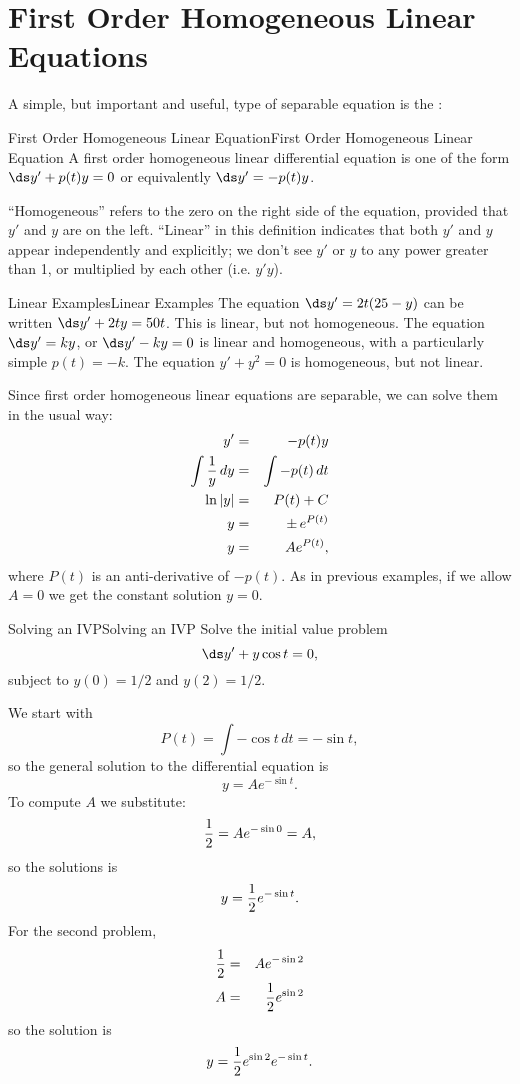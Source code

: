 \section{First Order Homogeneous Linear Equations}\label{sec:first order homogeneous linear}
A simple, but important and useful, type of separable equation is the
:

\begin{definition}{First Order Homogeneous Linear Equation}{First Order Homogeneous Linear Equation}\label{First Order Homogeneous Linear Equation}
A first order homogeneous linear differential equation
is one of
the form $\ds y' + p(t)y=0$
or equivalently
$\ds y' = -p(t)y$.
\end{definition}

``Homogeneous'' refers to the zero on the right side of the equation, provided that $y'$ and $y$ are on the left. ``Linear'' in this definition indicates that both $y'$ and $y$ appear independently and explicitly; we don't see $y'$ or $y$ to any power greater than 1, or multiplied by each other (i.e. $y'y$).

\begin{example}{Linear Examples}{Linear Examples}\label{Linear Examples}
 The equation $\ds y' = 2t(25-y)$ can be written
$\ds y' + 2ty= 50t$. This is linear, but not homogeneous. The
equation $\ds y'=ky$, or $\ds y'-ky=0$ is linear and
homogeneous, with a particularly simple $p(t)=-k$.
The equation $y'+y^2=0$ is homogeneous, but not linear.
\end{example}

Since first order homogeneous linear equations are separable, we can
solve them in the usual way:
\begin{eqnarray*}
y' &=& -p(t)y\cr
\int {1\over y}\,dy &=& \int -p(t)\,dt\cr
\ln|y| &=& P(t)+C\cr
y&=&\pm\,e^{P(t)}\cr
y&=&Ae^{P(t)},
\end{eqnarray*}
where $P(t)$ is an anti-derivative of $-p(t)$. As in previous
examples, if we allow $A=0$ we get the constant solution $y=0$.

\begin{example}{Solving an IVP}{Solving an IVP}\label{Solving an IVP}
 Solve the initial value problem 
$$\ds y' + y\cos t =0,$$
subject to $y(0)=1/2$ and $y(2)=1/2$.
\end{example}

\begin{solution}
We start with
$$P(t)=\int -\cos t\,dt = -\sin t,$$
so the general solution to the differential equation is
$$y=Ae^{-\sin t}.$$
To compute $A$ we substitute:
$$ {1\over 2} = Ae^{-\sin 0} = A,$$
so the solutions is 
$$ y = {1\over 2} e^{-\sin t}.$$
For the second problem,
\begin{eqnarray*}
{1\over 2} &=& Ae^{-\sin 2}\cr
A &=& {1\over 2}e^{\sin 2}
\end{eqnarray*}
so the solution is 
$$ y = {1\over 2}e^{\sin 2}e^{-\sin t}.$$
\vskip-15pt\end{solution}

